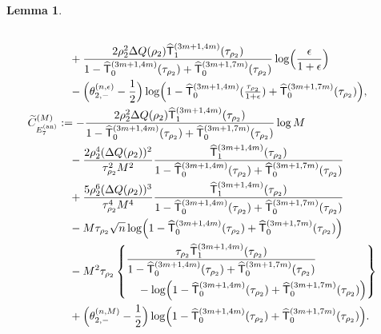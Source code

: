 \documentclass[a4paper]{article}
\newtheorem{lemma}[theorem]{Lemma}
\numberwithin{equation}{section}
\begin{document}
\begin{lemma}
\begin{align*}
\\
&\quad 
+\frac{2\rho_2^2\Delta Q(\rho_2)\widehat{\mathsf{T}}_{1}^{(3m+1,4m)}(\tau_{\rho_2})}{1-\widehat{\mathsf{T}}_0^{(3m+1,4m)}(\tau_{\rho_2})+\widehat{\mathsf{T}}_0^{(3m+1,7m)}(\tau_{\rho_2})}
\log\Bigl(\frac{\epsilon}{1+\epsilon}\Bigr)
\\
&\quad 
-\Bigl(\theta_{2,-}^{(n,\epsilon)}-\frac{1}{2}\Bigr)\log\Bigl(1-\widehat{\mathsf{T}}_0^{(3m+1,4m)}(\tfrac{\tau_{\rho_2}}{1+\epsilon})+\widehat{\mathsf{T}}_0^{(3m+1,7m)}(\tau_{\rho_2})\Bigr),
\\
\widetilde{C}_{E_{7}^{(\mathrm{an})}}^{(M)}
&:=
-\frac{2\rho_2^2\Delta Q(\rho_2)\widehat{\mathsf{T}}_{1}^{(3m+1,4m)}(\tau_{\rho_2})}{1-\widehat{\mathsf{T}}_0^{(3m+1,4m)}(\tau_{\rho_2})+\widehat{\mathsf{T}}_0^{(3m+1,7m)}(\tau_{\rho_2})}
\log M
\\
&\quad 
-\frac{2\rho_2^4(\Delta Q(\rho_2))^2}{\tau_{\rho_2}^2M^2}
\frac{\widehat{\mathsf{T}}_{1}^{(3m+1,4m)}(\tau_{\rho_2})}{1-\widehat{\mathsf{T}}_0^{(3m+1,4m)}(\tau_{\rho_2})+\widehat{\mathsf{T}}_0^{(3m+1,7m)}(\tau_{\rho_2})}
\\
&\quad 
+\frac{5\rho_2^6(\Delta Q(\rho_2))^3}{\tau_{\rho_2}^4M^4}
\frac{\widehat{\mathsf{T}}_{1}^{(3m+1,4m)}(\tau_{\rho_2})}{1-\widehat{\mathsf{T}}_0^{(3m+1,4m)}(\tau_{\rho_2})+\widehat{\mathsf{T}}_0^{(3m+1,7m)}(\tau_{\rho_2})}
\\
&\quad 
-M\tau_{\rho_2}\sqrt{n}
\log\Bigl(1-\widehat{\mathsf{T}}_0^{(3m+1,4m)}(\tau_{\rho_2})+\widehat{\mathsf{T}}_0^{(3m+1,7m)}(\tau_{\rho_2})\Bigr)
\\
&\quad 
-M^2\tau_{\rho_2}\left\{\begin{aligned}&
\frac{\tau_{\rho_2}\widehat{\mathsf{T}}_1^{(3m+1,4m)}(\tau_{\rho_2})}{1-\widehat{\mathsf{T}}_0^{(3m+1,4m)}(\tau_{\rho_2})+\widehat{\mathsf{T}}_0^{(3m+1,7m)}(\tau_{\rho_2})}
\\
&\quad-
\log\Bigl(1-\widehat{\mathsf{T}}_0^{(3m+1,4m)}(\tau_{\rho_2})+\widehat{\mathsf{T}}_0^{(3m+1,7m)}(\tau_{\rho_2})\Bigr)
\end{aligned}\right\}
\\
&\quad 
+\Bigl(\theta_{2,-}^{(n,M)}-\frac{1}{2}\Bigr)
\log\Bigl(1-\widehat{\mathsf{T}}_0^{(3m+1,4m)}(\tau_{\rho_2})+\widehat{\mathsf{T}}_0^{(3m+1,7m)}(\tau_{\rho_2})\Bigr). 
\end{align*}
\end{lemma}
\end{document}
